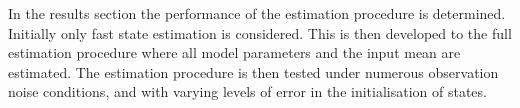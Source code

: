 In the results section the performance of the estimation procedure is determined. Initially only fast state estimation is considered. This is then developed to the full estimation procedure where all model parameters and the input mean are estimated. The estimation procedure is then tested under numerous observation noise conditions, and with varying levels of error in the initialisation of states.
